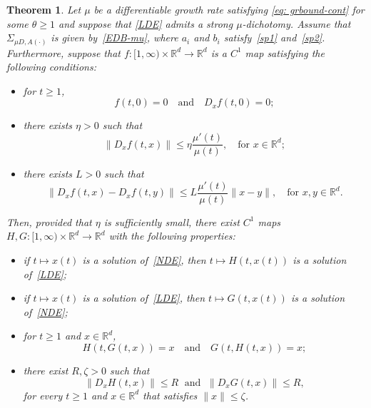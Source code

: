 \documentclass[10pt,a4paper]{amsart}
\newtheorem{theorem}{Theorem}
\def\R{\mathbb{R}}
\begin{document}
\begin{theorem}\label{theo: linarization continuous time pol}
Let $\mu$ be a differentiable growth rate satisfying \eqref{eq: grbound-cont} for some $\theta\geq 1$ and suppose that \eqref{LDE} admits a strong $\mu$-dichotomy. Assume that $\Sigma_{\mu D, A(\cdot)}$ is given by~\eqref{EDB-mu}, where $a_i$ and $b_i$ satisfy~\eqref{sp1} and~\eqref{sp2}.
 Furthermore, suppose that $f\colon [1, \infty)\times \R^d \to \R^d$ is a $C^1$ map satisfying the following conditions:
\begin{itemize}
\item for $t\ge 1$,
\begin{equation}\label{1950}
f(t,0)=0 \quad \text{and} \quad D_x f(t,0)=0;
\end{equation}
\item there exists $\eta >0$ such that 
\begin{equation}\label{1951}
\| D_x f(t,x)\| \le \eta \frac{\mu'(t)}{\mu(t)}, \quad \text{for $x\in \R^d$};
\end{equation}
\item there exists $L>0$ such that 
\begin{equation}\label{1952}
\|D_x f(t,x)-D_x f(t, y)\| \le L\frac{\mu'(t)}{\mu(t)} \|x-y\|, \quad \text{for $x, y\in \R^d$}.
\end{equation}
\end{itemize}
Then, provided that $\eta$ is sufficiently small,  there exist $C^1$ maps $H, G\colon [1, \infty) \times \R^d \to \R^d$ with the following properties:
\begin{itemize}
\item[i)] if $t\mapsto x(t)$ is a solution of~\eqref{NDE}, then $t\mapsto H(t, x(t))$ is a solution of~\eqref{LDE};
\item[ii)] if $t\mapsto x(t)$ is a solution of~\eqref{LDE}, then $t\mapsto G(t, x(t))$ is a solution of~\eqref{NDE};
\item[iii)] for $t\ge 1$ and $x\in \R^d$, 
\[
H(t, G(t,x))=x \quad \text{and} \quad G(t, H(t,x))=x;
\]
\item[iv)] there exist $R, \zeta>0$ such that 
\[
\|D_xH(t,x)\|\leq R \; \text{ and }\; \|D_xG(t,x)\| \leq R , 
\]
for every $t\geq 1$ and $x\in \R^d$ that satisfies $\|x\|\leq \zeta$.
\end{itemize}
\end{theorem}
\end{document}
